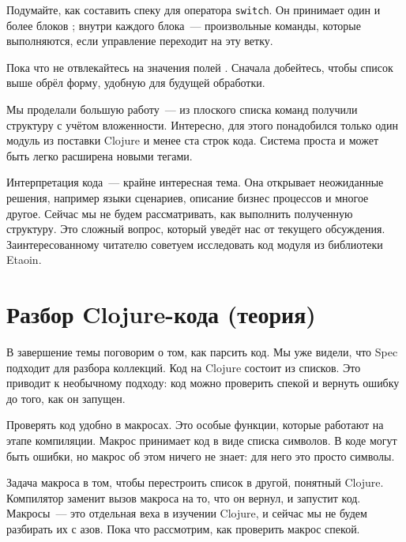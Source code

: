 Подумайте, как составить спеку для оператора \texttt{switch}. Он принимает один
и более блоков ; внутри каждого блока~--- произвольные команды,
которые выполняются, если управление переходит на эту ветку.

\begin{clojure}
\end{clojure}

Пока что не отвлекайтесь на значения полей . Сначала добейтесь,
чтобы список выше обрёл форму, удобную для будущей обработки.

Мы проделали большую работу~--- из плоского списка команд получили структуру с
учётом вложенности. Интересно, для этого понадобился только один модуль из
поставки Clojure и менее ста строк кода. Система проста и может быть легко
расширена новыми тегами.

Интерпретация кода~--- крайне интересная тема. Она открывает неожиданные
решения, например языки сценариев, описание бизнес процессов и многое
другое. Сейчас мы не будем рассматривать, как выполнить полученную
структуру. Это сложный вопрос, который уведёт нас от текущего
обсуждения. Заинтересованному читателю советуем исследовать код модуля
 из библиотеки Etaoin.

\section{Разбор Clojure-кода (теория)}


В завершение темы поговорим о том, как парсить код. Мы уже видели, что Spec
подходит для разбора коллекций. Код на Clojure состоит из списков. Это приводит
к необычному подходу: код можно проверить спекой и вернуть ошибку до того, как
он запущен.

Проверять код удобно в макросах. Это особые функции, которые работают на этапе
компиляции. Макрос принимает код в виде списка символов. В коде могут быть
ошибки, но макрос об этом ничего не знает: для него это просто символы.

Задача макроса в том, чтобы перестроить список в другой, понятный
Clojure. Компилятор заменит вызов макроса на то, что он вернул, и запустит
код. Макросы~--- это отдельная веха в изучении Clojure, и сейчас мы не будем
разбирать их с азов. Пока что рассмотрим, как проверить макрос спекой.

